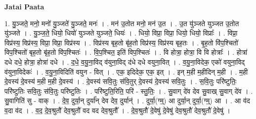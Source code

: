 \documentclass[17pt]{extarticle}
\begin{document}
\textbf{Jatai Paata} \newline

1. यु॒ञ्जते॒ मनो॒ मनो॑ यु॒ञ्जते॑ यु॒ञ्जते॒ मनः॑ । . मन॑ उ॒तोत मनो॒ मन॑ उ॒त । . उ॒त यु॑ञ्जते युञ्जत उ॒तोत यु॑ञ्जते । . यु॒ञ्ज॒ते॒ धियो॒ धियो॑ युञ्जते युञ्जते॒ धियः॑ । . धियो॒ विप्रा॒ विप्रा॒ धियो॒ धियो॒ विप्राः᳚ । . विप्रा॒ विप्र॑स्य॒ विप्र॑स्य॒ विप्रा॒ विप्रा॒ विप्र॑स्य । . विप्र॑स्य बृह॒तो बृ॑ह॒तो विप्र॑स्य॒ विप्र॑स्य बृह॒तः । . बृ॒ह॒तो वि॑प॒श्चितो॑ विप॒श्चितो॑ बृह॒तो बृ॑ह॒तो वि॑प॒श्चितः॑ । . वि॒प॒श्चित॒ इति॑ विप॒श्चितः॑ । . वि होत्रा॒ होत्रा॒ वि वि होत्राः᳚ । . होत्रा॑ दधे दधे॒ होत्रा॒ होत्रा॑ दधे । . द॒धे॒ व॒यु॒ना॒विद् व॑युना॒विद् द॑धे दधे वयुना॒वित् । . व॒यु॒ना॒विदेक॒ एको॑ वयुना॒विद् व॑युना॒विदेकः॑ । . व॒यु॒ना॒विदिति॑ वयुन - वित् । . एक॒ इदिदेक॒ एक॒ इत् । . इन् म॒ही म॒हीदिन् म॒ही । . म॒ही दे॒वस्य॑ दे॒वस्य॑ म॒ही म॒ही दे॒वस्य॑ । . दे॒वस्य॑ सवि॒तुः स॑वि॒तुर् दे॒वस्य॑ दे॒वस्य॑ सवि॒तुः । . स॒वि॒तुः परि॑ष्टुतिः॒ परि॑ष्टुतिः सवि॒तुः स॑वि॒तुः परि॑ष्टुतिः । . परि॑ष्टुति॒रिति॒ परि॑ - स्तु॒तिः॒ । . सु॒वाग् दे॑व देव सु॒वाख् सु॒वाग् दे॑व । . सु॒वागिति॑ सु - वाक् । . दे॒व॒ दुर्या॒न् दुर्या᳚न् देव देव॒ दुर्यान्॑ । . दुर्या॒(ग्म्॒) आ दुर्या॒न् दुर्या॒(ग्म्॒) आ । . आ व॑द व॒दा व॑द । . व॒द॒ दे॒व॒श्रुतौ॑ देव॒श्रुतौ॑ वद वद देव॒श्रुतौ᳚ । . दे॒व॒श्रुतौ॑ दे॒वेषु॑ दे॒वेषु॑ देव॒श्रुतौ॑ देव॒श्रुतौ॑ दे॒वेषु॑ । \newline
\end{document}
